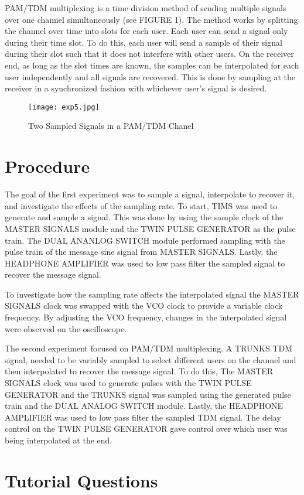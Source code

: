 \documentclass[letterpaper,11pt]{article}
\begin{document}
PAM/TDM multiplexing is a time division method of sending multiple signals over one channel simultaneously (see FIGURE 1). The method works by splitting the channel over time into slots for each user.  Each user can send a signal only during their time slot.  To do this, each user will send a sample of their signal during their slot such that it does not interfere with other users.  On the receiver end, as long as the slot times are known, the samples can be interpolated for each user independently and all signals are recovered.  This is done by sampling at the receiver in a synchronized fashion with whichever user's signal is desired.
\begin{figure}[H]
  \texttt{[image: exp5.jpg]}
  \caption{Two Sampled Signals in a PAM/TDM Chanel}
\end{figure}


\section{Procedure}

The goal of the first experiment was to sample a signal, interpolate to recover it, and investigate the effects of the sampling rate.  To start, TIMS was used to generate and sample a signal.  This was done by using the sample clock of the MASTER SIGNALS module and the TWIN PULSE GENERATOR as the pulse train.  The DUAL ANANLOG SWITCH module performed sampling with the pulse train of the message sine signal from MASTER SIGNALS.  Lastly, the HEADPHONE AMPLIFIER was used to low pass filter the sampled signal to recover the message signal.

To investigate how the sampling rate affects the interpolated signal the MASTER SIGNALS clock was swapped with the VCO clock to provide a variable clock frequency.  By adjusting the VCO frequency, changes in the interpolated signal were observed on the oscilloscope. 

The second experiment focused on PAM/TDM multiplexing.  A TRUNKS TDM signal, needed to be variably sampled to select different users on the channel and then interpolated to recover the message signal.  To do this, The MASTER SIGNALS clock was used to generate pulses with the TWIN PULSE GENERATOR and the TRUNKS signal was sampled using the generated pulse train and the DUAL ANALOG SWITCH module.  Lastly, the HEADPHONE AMPLIFIER was used to low pass filter the sampled TDM signal.  The delay control on the TWIN PULSE GENERATOR gave control over which user was being interpolated at the end. 
\section{Tutorial Questions}
\end{document}
